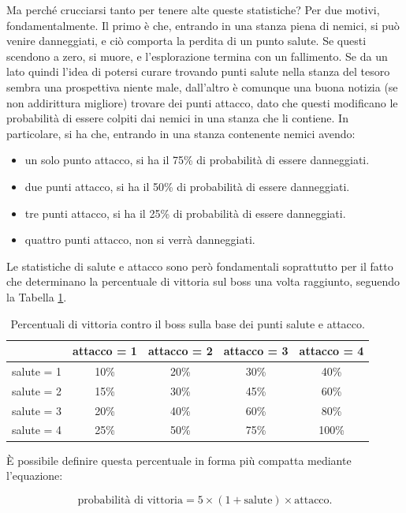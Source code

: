 \documentclass{book}
\theoremstyle{definition}
\theoremstyle{definition}
\theoremstyle{definition}
\theoremstyle{plain}
\theoremstyle{plain}
\theoremstyle{plain}
\theoremstyle{plain}
\begin{document}
Ma perché crucciarsi tanto per tenere alte queste statistiche? Per due motivi, fondamentalmente. Il primo è che, entrando in una stanza piena di nemici, si può venire danneggiati, e ciò comporta la perdita di un punto salute. Se questi scendono a zero, si muore, e l'esplorazione termina con un fallimento. Se da un lato quindi l'idea di potersi curare trovando punti salute nella stanza del tesoro sembra una prospettiva niente male, dall'altro è comunque una buona notizia (se non addirittura migliore) trovare dei punti attacco, dato che questi modificano le probabilità di essere colpiti dai nemici in una stanza che li contiene. In particolare, si ha che, entrando in una stanza contenente nemici avendo:
\begin{itemize}
    \item un solo punto attacco, si ha il 75\% di probabilità di essere danneggiati.
    \item due punti attacco, si ha il 50\% di probabilità di essere danneggiati.
    \item tre punti attacco, si ha il 25\% di probabilità di essere danneggiati.
    \item quattro punti attacco, non si verrà danneggiati.
\end{itemize}
Le statistiche di salute e attacco sono però fondamentali soprattutto per il fatto che determinano la percentuale di vittoria sul boss una volta raggiunto, seguendo la Tabella \ref{table:6.1}.
\begin{table}[H]
\captionsetup{font=scriptsize}
\centering
\begin{tabular}{|c|c|c|c|c|}
    \hline
      & attacco = 1 & attacco = 2 & attacco = 3 & attacco = 4\\
         \hline
    salute = 1 & 10\% & 20\% & 30\% & 40\%\\
         \hline
    salute = 2 & 15\% & 30\% & 45\% & 60\%\\   
         \hline
    salute = 3 & 20\% & 40\% & 60\% & 80\%\\     
         \hline
    salute = 4 & 25\% & 50\% & 75\% & 100\%\\
        \hline
\end{tabular}
\caption{\scriptsize Percentuali di vittoria contro il boss sulla base dei punti salute e attacco.}\label{table:6.1}
\end{table}
\noindent È possibile definire questa percentuale in forma più compatta mediante l'equazione:
\begin{figure}[H]
\begin{displaymath}
\text{probabilità di vittoria} = 5 \times (1 + \text{salute}) \times \text{attacco.}
\end{displaymath}
\end{figure}
\end{document}
